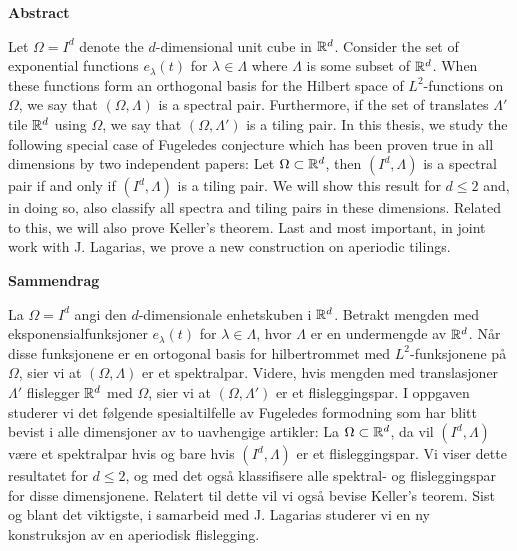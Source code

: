 





\begin{center}\textsf{\textbf{\large Abstract}}\end{center} 

Let $\Omega=I^d$ denote the $d$-dimensional unit cube in $\mathbb{R}^d$. Consider the set of exponential functions $e_\lambda(t)$ for $\lambda \in \Lambda$ where $\Lambda$ is some subset of $\mathbb{R}^d$. When these functions form an orthogonal basis for the Hilbert space of $L^2$-functions on $\Omega$, we say that $(\Omega,\Lambda)$ is a spectral pair. Furthermore, if the set of translates $\Lambda'$ tile $\mathbb{R}^d$ using $\Omega$, we say that $(\Omega,\Lambda')$ is a tiling pair. In this thesis, we study the following special case of Fugeledes conjecture which has been proven true in all dimensions by two independent papers: Let $\Omega\subset\mathbb{R}^d$, then $(I^d,\Lambda)$ is a spectral pair if and only if $(I^d,\Lambda)$ is a tiling pair. We will show this result for $d\leq2$ and, in doing so, also classify all spectra and tiling pairs in these dimensions. Related to this, we will also prove Keller's theorem. Last and most important, in joint work with J. Lagarias, we prove a new construction on aperiodic tilings. 

\begin{center}\textsf{\textbf{\large Sammendrag}}\end{center} 

La $\Omega=I^d$ angi den $d$-dimensionale enhetskuben i $\mathbb{R}^d$. Betrakt mengden med eksponensialfunksjoner $e_\lambda(t)$ for $\lambda \in \Lambda$, hvor $\Lambda$ er en undermengde av $\mathbb{R}^d$. Når disse funksjonene er en ortogonal basis for hilbertrommet med $L^2$-funksjonene på $\Omega$, sier vi at $(\Omega,\Lambda)$ er et spektralpar. Videre, hvis mengden med translasjoner $\Lambda'$ flislegger $\mathbb{R}^d$ med $\Omega$, sier vi at $(\Omega,\Lambda')$ er et flisleggingspar. I oppgaven studerer vi det følgende spesialtilfelle av Fugeledes formodning som har blitt bevist i alle dimensjoner av to uavhengige artikler: La $\Omega\subset\mathbb{R}^d$, da vil $(I^d,\Lambda)$ være et spektralpar hvis og bare hvis $(I^d,\Lambda)$ er et flisleggingspar. Vi viser dette resultatet for $d\leq2$, og med det også klassifisere alle spektral- og flisleggingspar for disse dimensjonene. Relatert til dette vil vi også bevise Keller's teorem. Sist og blant det viktigste, i samarbeid med J. Lagarias studerer vi en ny konstruksjon av en aperiodisk flislegging.  


 